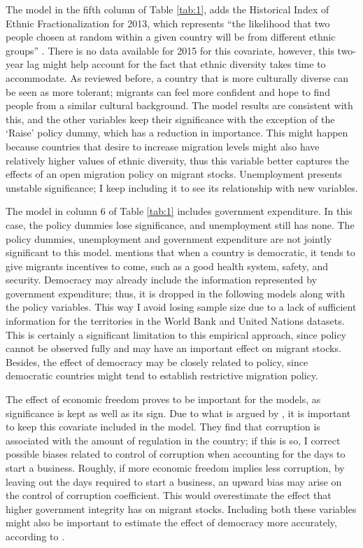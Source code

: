 \documentclass[../main.tex]{subfiles}
\begin{document}
The model in the fifth column of Table \ref{tab:1}, adds the Historical Index of Ethnic Fractionalization for 2013, which represents “the likelihood that two people chosen at random within a given country will be from different ethnic groups” \parencite[pp.1]{Drazanova.2019}. There is no data available for 2015 for this covariate, however, this two-year lag might help account for the fact that ethnic diversity takes time to accommodate. As reviewed before, a country that is more culturally diverse can be seen as more tolerant; migrants can feel more confident and hope to find people from a similar cultural background. The model results are consistent with this, and the other variables keep their significance with the exception of the ‘Raise’ policy dummy, which has a reduction in importance. This might happen because countries that desire to increase migration levels might also have relatively higher values of ethnic diversity, thus this variable better captures the effects of an open migration policy on migrant stocks. Unemployment presents unstable significance; I keep including it to see its relationship with new variables. 

The model in column 6 of Table \ref{tab:1} includes government expenditure. In this case, the policy dummies lose significance, and unemployment still has none. The policy dummies, unemployment and government expenditure are not jointly significant to this model. \textcite{Azad.2020} mentions that when a country is democratic, it tends to give migrants incentives to come, such as a good health system, safety, and security. Democracy may already include the information represented by government expenditure; thus, it is dropped in the following models along with the policy variables. This way I avoid losing sample size due to a lack of sufficient information for the territories in the World Bank and United Nations datasets. This is certainly a significant limitation to this empirical approach, since policy cannot be observed fully and may have an important effect on migrant stocks. Besides, the effect of democracy may be closely related to policy, since democratic countries might tend to establish restrictive migration policy. 

The effect of economic freedom proves to be important for the models, as significance is kept as well as its sign. Due to what is argued by \textcite{Holcombe.2015}, it is important to keep this covariate included in the model. They find that corruption is associated with the amount of regulation in the country; if this is so, I correct possible biases related to control of corruption when accounting for the days to start a business. Roughly, if more economic freedom implies less corruption, by leaving out the days required to start a business, an upward bias may arise on the control of corruption coefficient. This would overestimate the effect that higher government integrity has on migrant stocks. Including both these variables might also be important to estimate the effect of democracy more accurately, according to \textcite{Prada.2020}. 
\end{document}
